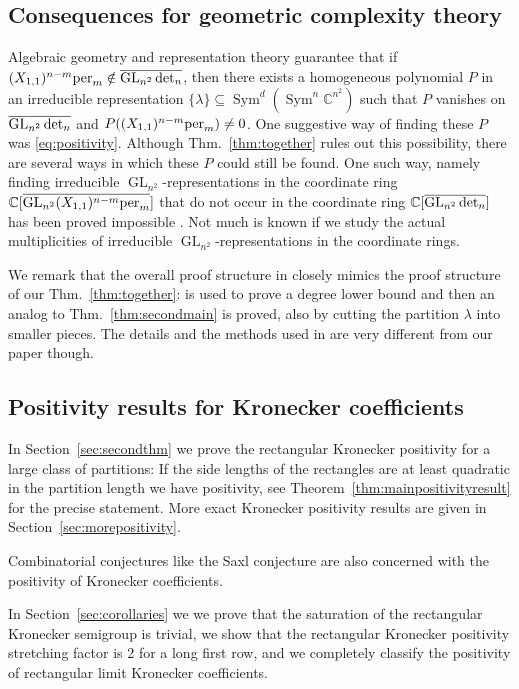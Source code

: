 \documentclass{article}
\numberwithin{equation}{section}
\theoremstyle{definition}
\def\la{\lambda}
\newcommand{\IC}{\mathbb C}
\DeclareMathOperator{\GL}{GL}
\DeclareMathOperator{\Sym}{Sym}
\renewcommand{\det}{\textup{det}}
\newcommand{\per}{\textup{per}}
\begin{document}
\subsection{Consequences for geometric complexity theory}\label{sec:consequences}
Algebraic geometry and representation theory guarantee that if $(X_{1,1})^{n-m}\per_m \notin \overline{\GL_{n^2}\det_n}$,
then there exists a homogeneous polynomial $P$ in an irreducible representation $\{\la\}\subseteq \Sym^d(\Sym^n\IC^{n^2})$ such that
$P$ vanishes on $\overline{\GL_{n^2}\det_n}$ and $P((X_{1,1})^{n-m}\per_m)\neq 0$.
One suggestive way of finding these $P$ was \eqref{eq:positivity}.
Although Thm.~\ref{thm:together} rules out this possibility,
there are several ways in which these $P$ could still be found.
One such way, namely finding irreducible $\GL_{n^2}$-representations in
the coordinate ring $\IC[\overline{\GL_{n^2}(X_{1,1})^{n-m}\per_m}]$ that do not occur in
the coordinate ring $\IC[\overline{\GL_{n^2}\det_n}]$ has been proved impossible \cite{BIP:16}.
Not much is known if we study the actual multiplicities of irreducible $\GL_{n^2}$-representations in the coordinate rings.




We remark that the overall proof structure in \cite{BIP:16} closely mimics the proof structure of our Thm.~\ref{thm:together}:
\cite{LK:12} is used to prove a degree lower bound and then an analog to Thm.~\ref{thm:secondmain} is proved,
also by cutting the partition $\la$ into smaller pieces.
The details and the methods used in \cite{BIP:16} are very different from our paper though.


\subsection{Positivity results for Kronecker coefficients}

In Section~\ref{sec:secondthm} we prove the rectangular Kronecker positivity for a large class of partitions:
If the side lengths of the rectangles are at least quadratic in the partition length we have positivity,
see Theorem~\ref{thm:mainpositivityresult} for the precise statement.
More exact Kronecker positivity results are given in Section~\ref{sec:morepositivity}.

Combinatorial conjectures like the Saxl conjecture \cite{ppv:14,Ike:15,LS:15} are also concerned with the positivity of Kronecker coefficients.

In Section~\ref{sec:corollaries} we we prove that the saturation of the rectangular Kronecker semigroup is trivial,
we show that the rectangular Kronecker positivity stretching factor is 2 for a long first row,
and we completely classify the positivity of
rectangular limit Kronecker coefficients.
\end{document}
